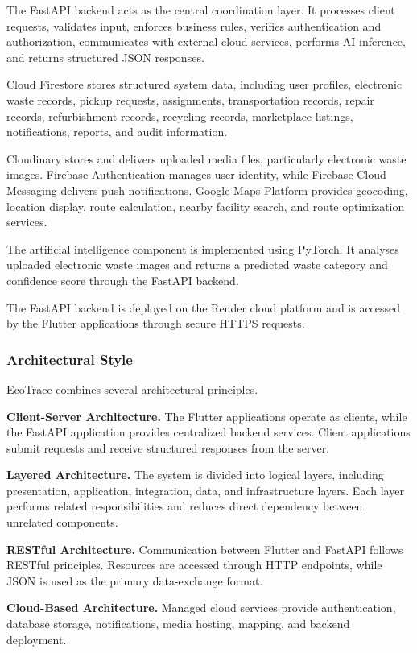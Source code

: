 The FastAPI backend acts as the central coordination layer. It processes client
requests, validates input, enforces business rules, verifies authentication and
authorization, communicates with external cloud services, performs AI
inference, and returns structured JSON responses.

Cloud Firestore stores structured system data, including user profiles,
electronic waste records, pickup requests, assignments, transportation records,
repair records, refurbishment records, recycling records, marketplace listings,
notifications, reports, and audit information.

Cloudinary stores and delivers uploaded media files, particularly electronic
waste images. Firebase Authentication manages user identity, while Firebase
Cloud Messaging delivers push notifications. Google Maps Platform provides
geocoding, location display, route calculation, nearby facility search, and route
optimization services.

The artificial intelligence component is implemented using PyTorch. It
analyses uploaded electronic waste images and returns a predicted waste
category and confidence score through the FastAPI backend.

The FastAPI backend is deployed on the Render cloud platform and is
accessed by the Flutter applications through secure HTTPS requests.

\subsubsection{Architectural Style}

EcoTrace combines several architectural principles.

\textbf{Client-Server Architecture.} The Flutter applications operate as
clients, while the FastAPI application provides centralized backend services.
Client applications submit requests and receive structured responses from the
server.

\textbf{Layered Architecture.} The system is divided into logical layers,
including presentation, application, integration, data, and infrastructure
layers. Each layer performs related responsibilities and reduces direct
dependency between unrelated components.

\textbf{RESTful Architecture.} Communication between Flutter and FastAPI
follows RESTful principles. Resources are accessed through HTTP endpoints,
while JSON is used as the primary data-exchange format.

\textbf{Cloud-Based Architecture.} Managed cloud services provide
authentication, database storage, notifications, media hosting, mapping, and
backend deployment.

